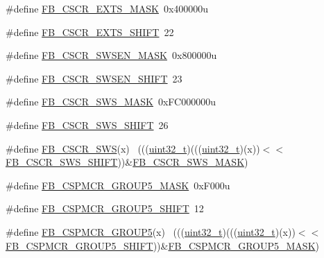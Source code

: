 \begin{DoxyCompactItemize}
\item 
\#define \hyperlink{group___f_b___register___masks_ga1bc7960fd554faa076ba6e34fddaf081}{F\+B\+\_\+\+C\+S\+C\+R\+\_\+\+E\+X\+T\+S\+\_\+\+M\+A\+SK}~0x400000u
\item 
\#define \hyperlink{group___f_b___register___masks_ga095a10ba51cbcdf10aca9bf9d5692613}{F\+B\+\_\+\+C\+S\+C\+R\+\_\+\+E\+X\+T\+S\+\_\+\+S\+H\+I\+FT}~22
\item 
\#define \hyperlink{group___f_b___register___masks_ga38d5806081b68b58dff2b73abcab4d1a}{F\+B\+\_\+\+C\+S\+C\+R\+\_\+\+S\+W\+S\+E\+N\+\_\+\+M\+A\+SK}~0x800000u
\item 
\#define \hyperlink{group___f_b___register___masks_gad89987be24118d73c55bf5e97ab5e8d7}{F\+B\+\_\+\+C\+S\+C\+R\+\_\+\+S\+W\+S\+E\+N\+\_\+\+S\+H\+I\+FT}~23
\item 
\#define \hyperlink{group___f_b___register___masks_ga1036d22baaa692a66480d3ef93bc9729}{F\+B\+\_\+\+C\+S\+C\+R\+\_\+\+S\+W\+S\+\_\+\+M\+A\+SK}~0x\+F\+C000000u
\item 
\#define \hyperlink{group___f_b___register___masks_ga1ba720e1700a6ddc15457b55d8fbb376}{F\+B\+\_\+\+C\+S\+C\+R\+\_\+\+S\+W\+S\+\_\+\+S\+H\+I\+FT}~26
\item 
\#define \hyperlink{group___f_b___register___masks_ga88bb14898062706f58a15f988c6aad47}{F\+B\+\_\+\+C\+S\+C\+R\+\_\+\+S\+WS}(x)                                                  ~(((\hyperlink{_p_e___types_8h_a33594304e786b158f3fb30289278f5af}{uint32\+\_\+t})(((\hyperlink{_p_e___types_8h_a33594304e786b158f3fb30289278f5af}{uint32\+\_\+t})(x))$<$$<$\hyperlink{group___f_b___register___masks_ga1ba720e1700a6ddc15457b55d8fbb376}{F\+B\+\_\+\+C\+S\+C\+R\+\_\+\+S\+W\+S\+\_\+\+S\+H\+I\+FT}))\&\hyperlink{group___f_b___register___masks_ga1036d22baaa692a66480d3ef93bc9729}{F\+B\+\_\+\+C\+S\+C\+R\+\_\+\+S\+W\+S\+\_\+\+M\+A\+SK})
\item 
\#define \hyperlink{group___f_b___register___masks_ga2c198cc055fa5fd82f9f9441613af96d}{F\+B\+\_\+\+C\+S\+P\+M\+C\+R\+\_\+\+G\+R\+O\+U\+P5\+\_\+\+M\+A\+SK}~0x\+F000u
\item 
\#define \hyperlink{group___f_b___register___masks_gaa406022bcdd78d1d96d379efcf539ca7}{F\+B\+\_\+\+C\+S\+P\+M\+C\+R\+\_\+\+G\+R\+O\+U\+P5\+\_\+\+S\+H\+I\+FT}~12
\item 
\#define \hyperlink{group___f_b___register___masks_ga63e0efd92a457661052bdbbc62f800af}{F\+B\+\_\+\+C\+S\+P\+M\+C\+R\+\_\+\+G\+R\+O\+U\+P5}(x)                                        ~(((\hyperlink{_p_e___types_8h_a33594304e786b158f3fb30289278f5af}{uint32\+\_\+t})(((\hyperlink{_p_e___types_8h_a33594304e786b158f3fb30289278f5af}{uint32\+\_\+t})(x))$<$$<$\hyperlink{group___f_b___register___masks_gaa406022bcdd78d1d96d379efcf539ca7}{F\+B\+\_\+\+C\+S\+P\+M\+C\+R\+\_\+\+G\+R\+O\+U\+P5\+\_\+\+S\+H\+I\+FT}))\&\hyperlink{group___f_b___register___masks_ga2c198cc055fa5fd82f9f9441613af96d}{F\+B\+\_\+\+C\+S\+P\+M\+C\+R\+\_\+\+G\+R\+O\+U\+P5\+\_\+\+M\+A\+SK})

\end{DoxyCompactItemize}
